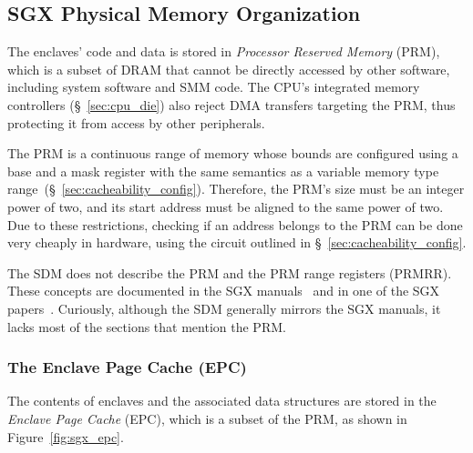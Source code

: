 \subsection{SGX Physical Memory Organization}
\label{sec:sgx_prm}


The enclaves' code and data is stored in \textit{Processor Reserved Memory}
(PRM), which is a subset of DRAM that cannot be directly accessed by other
software, including system software and SMM code. The CPU's integrated memory
controllers (\S~\ref{sec:cpu_die}) also reject DMA transfers targeting the PRM,
thus protecting it from access by other peripherals.


The PRM is a continuous range of memory whose bounds are configured using a
base and a mask register with the same semantics as a variable memory type
range~(\S~\ref{sec:cacheability_config}). Therefore, the PRM's size must be an
integer power of two, and its start address must be aligned to the same power
of two. Due to these restrictions, checking if an address belongs to the PRM
can be done very cheaply in hardware, using the circuit outlined in
\S~\ref{sec:cacheability_config}.

The SDM does not describe the PRM and the PRM range registers (PRMRR). These
concepts are documented in the SGX
manuals~\cite{intel2013sgxmanual, intel2014sgx2manual} and in one of the SGX
papers~\cite{mckeen2013sgx}. Curiously, although the SDM generally mirrors the
SGX manuals, it lacks most of the sections that mention the PRM.


\subsubsection{The Enclave Page Cache (EPC)}
\label{sec:sgx_epc}


The contents of enclaves and the associated data structures are stored in the
\textit{Enclave Page Cache} (EPC), which is a subset of the PRM, as shown in
Figure~\ref{fig:sgx_epc}.

